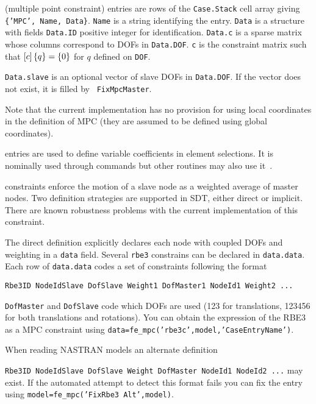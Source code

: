 
 (multiple point constraint) entries are rows of the {\tt Case.Stack} cell array giving {\tt \{'MPC', Name, Data\}}. {\tt Name} is a string identifying the entry. {\tt Data} is a structure with fields {\tt Data.ID} positive integer for identification. {\tt Data.c} is a sparse matrix whose columns correspond to DOFs in {\tt Data.DOF}. {\tt c} is the constraint matrix such that $\left[c\right] \left\{q\right\} = \left\{0\right\}$ for $q$ defined on {\tt DOF}.

{\tt Data.slave} is an optional vector of slave DOFs in {\tt Data.DOF}. If the vector does not exist, it is filled by \feutil\ {\tt FixMpcMaster}.

Note that the current implementation has no provision for using local coordinates in the definition of MPC (they are assumed to be defined using global coordinates).


 entries are used to define variable coefficients in element selections. It is nominally used through  commands but other routines may also use it~\cite{bal43}.


 constraints enforce the motion of a slave node as a weighted average of master nodes. Two definition strategies are supported in SDT, either direct or implicit. There are known robustness problems with the current implementation of this constraint.

The direct definition explicitly declares each node with coupled DOFs and weighting in a {\tt data} field. Several {\tt rbe3} constrains can be declared in {\tt data.data}. Each row of {\tt data.data} codes a set of constraints following the format

{\tt Rbe3ID NodeIdSlave DofSlave Weight1 DofMaster1 NodeId1 Weight2 ...}

{\tt DofMaster} and {\tt DofSlave} code which DOFs are used (123 for translations, 123456 for both translations and rotations). You can obtain the expression of the RBE3 as a MPC constraint using {\tt data=fe\_mpc('rbe3c',model,'CaseEntryName')}. 

When reading NASTRAN models an alternate definition 

{\tt Rbe3ID NodeIdSlave DofSlave Weight DofMaster NodeId1 NodeId2 ...}
%
may exist. If the automated attempt to detect this format fails you can fix the entry using {\tt model=fe\_mpc('FixRbe3 Alt',model)}. 


